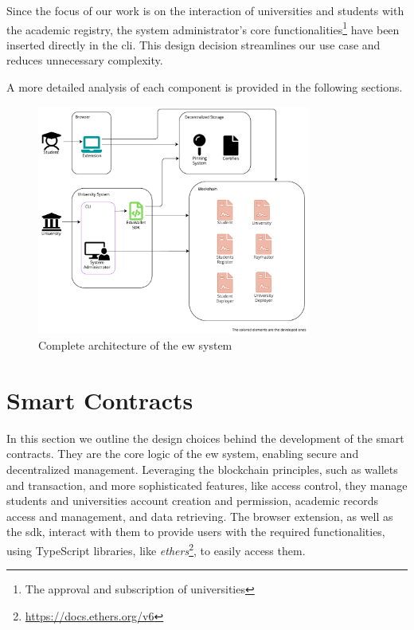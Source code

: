 Since the focus of our work is on the interaction of universities and students with the academic registry, the system administrator's core functionalities\footnote{The approval and subscription of universities} have been inserted directly in the \acrshort{cli}. This design decision streamlines our use case and reduces unnecessary complexity.

A more detailed analysis of each component is provided in the following sections.

\begin{figure}
  \centering
  \includegraphics[width=0.8\textwidth]{figures/Architecture diagram complete.pdf}
  \caption[System architecture diagram]{Complete architecture of the \acrlong{ew} system}
  \label{fig:fullArchDiag}
\end{figure}

\section{Smart Contracts}
\label{sec:smartContractsDesign}
In this section we outline the design choices behind the development of the smart contracts. They are the core logic of the \acrshort{ew} system, enabling secure and decentralized management. Leveraging the blockchain principles, such as wallets and transaction, and more sophisticated features, like access control, they manage students and universities account creation and permission, academic records access and management, and data retrieving. The browser extension, as well as the \acrshort{sdk}, interact with them to provide users with the required functionalities, using TypeScript libraries, like \textit{ethers}\footnote{\url{https://docs.ethers.org/v6}}, to easily access them.

